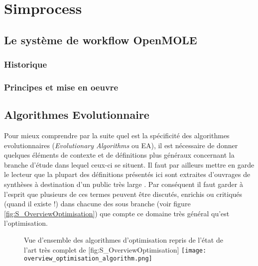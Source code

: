 
\section{Simprocess}
\label{sec:simprocess}

\subsection{Le système de workflow OpenMOLE}

\subsubsection{Historique}

\subsubsection{Principes et mise en oeuvre}

\subsection{Algorithmes Evolutionnaire}


Pour mieux comprendre par la suite quel est la spécificité des algorithmes evolutionnaires (\textit{Evolutionary Algorithms} ou EA), il est nécessaire de donner quelques éléments de contexte et de définitions plus généraux concernant la branche d'étude dans lequel ceux-ci se situent. Il faut par ailleurs mettre en garde le lecteur que la plupart des définitions présentés ici sont extraites d'ouvrages de synthèses à destination d'un public très large \autocites{Weise2011, Luke2013, Brownlee2012}. Par conséquent il faut garder à l'esprit que plusieurs de ces termes peuvent être discutés, enrichis ou critiqués (quand il existe !) dans chacune des sous branche (voir figure \ref{fig:S_OverviewOptimisation}) que compte ce domaine très général qu'est l'optimisation.

\begin{figure}[h]
\begin{sidecaption}[fortoc]{ Vue d'ensemble des algorithmes d'optimisation repris de l'état de l'art très complet de \textcite[32]{Weise2011}}[fig:S_OverviewOptimisation]
  \centering
 \texttt{[image: overview\_optimisation\_algorithm.png]}
  \end{sidecaption}
\end{figure}

